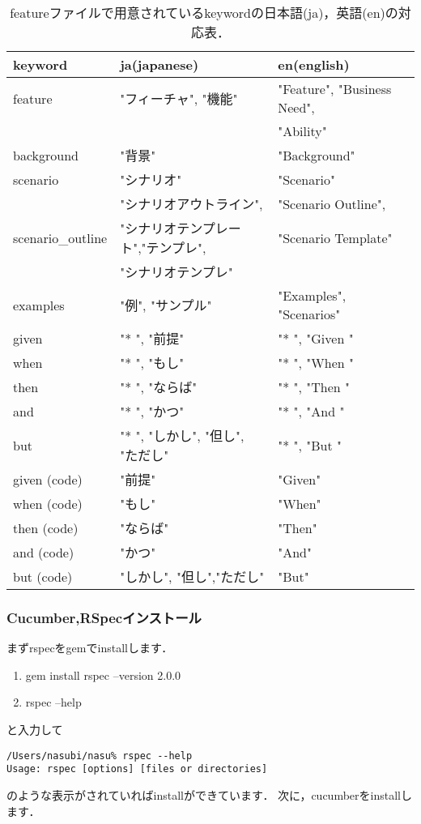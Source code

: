 \begin{table}[htbp]\begin{center}
\caption{featureファイルで用意されているkeywordの日本語(ja)，英語(en)の対応表．}
\label{table:one}
\begin{tabular}{llll}
\hline
keyword   &ja(japanese)   &en(english)  \\ \hline
 feature  & "フィーチャ", "機能"      &"Feature", "Business Need",   \\
 & &"Ability"     \\
background  &"背景"  &"Background"   \\
scenario  &"シナリオ"        &"Scenario"     \\
 &"シナリオアウトライン",  &"Scenario Outline",  \\
 scenario\_outline   &"シナリオテンプレート","テンプレ",  & "Scenario Template"   \\
 &"シナリオテンプレ"   & \\
examples  &"例", "サンプル"   &"Examples", "Scenarios"          \\
given   &"* ", "前提"        &"* ", "Given "          \\
when   &"* ", "もし"        &"* ", "When "  \\
then   &"* ", "ならば"       &"* ", "Then "  \\
and    &"* ", "かつ"        &"* ", "And "   \\
but    &"* ", "しかし", "但し", "ただし"  &"* ", "But "   \\
given (code)   &"前提"   &"Given"        \\
when (code)   &"もし"     &"When"         \\
then (code)   &"ならば"   &"Then"         \\
and (code)    &"かつ"     &"And"          \\
but (code)    &"しかし", "但し","ただし"   &"But"          \\
\hline
\end{tabular}
\label{default}
\end{center}\end{table}

\subsubsection{Cucumber,RSpecインストール}
まずrspecをgemでinstallします．

\begin{enumerate}
\item gem install rspec --version 2.0.0
\item rspec --help
\end{enumerate}
と入力して
\begin{lstlisting}[style=customCsh,basicstyle={\scriptsize\ttfamily}]
/Users/nasubi/nasu% rspec --help
Usage: rspec [options] [files or directories]
\end{lstlisting}
のような表示がされていればinstallができています．
次に，cucumberをinstallします．

